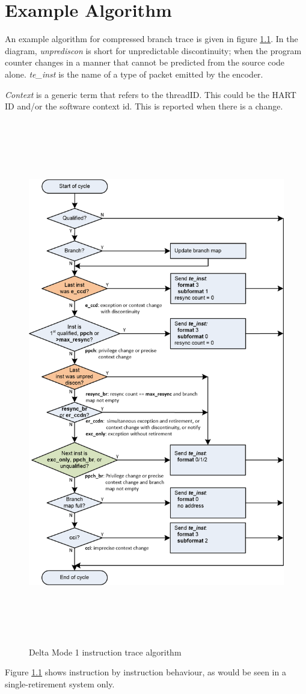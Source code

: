 \chapter{Example Algorithm}

An example algorithm for compressed branch trace is given in figure
\ref{fig:algo}. In the diagram, {\textit {unprediscon}} is short for
unpredictable discontinuity; when the program counter changes in a
manner that cannot be predicted from the source code alone. {\textit
  {te\_inst}} is the name of a type of packet emitted by the encoder.

\textit{Context} is a generic term that refers to the threadID. This
could be the HART ID and/or the software context id. This is reported
when there is a change.

\begin{figure}[l]
\begin{center}
  \includegraphics[height=23cm, width=15cm]{algo.png}
  \caption{Delta Mode 1 instruction trace algorithm}
  \label{fig:algo}
\end{center}
\end{figure}

Figure \ref{fig:algo} shows instruction by instruction behaviour, as would be
seen in a single-retirement system only.

